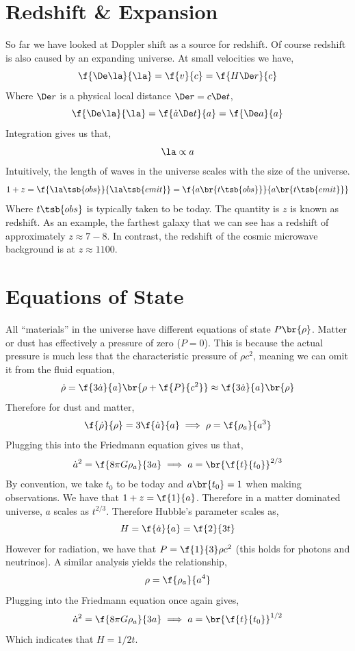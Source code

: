 \documentclass{article}
\begin{document}
\section{Redshift \& Expansion}
So far we have looked at Doppler shift as a source for redshift. Of course redshift is also caused by an expanding universe. At small velocities we have,
\[ \f{\De \la}{\la} = \f{v}{c} = \f{H \De r}{c} \]
Where $\De r$ is a physical local distance $\De r = c \De t$,
\[ \f{\De \la}{\la} = \f{\dot a \De t}{a} = \f{\De a}{a} \]
Integration gives us that,
\[ \la \propto a \]
Intuitively, the length of waves in the universe scales with the size of the universe.
\[ 1 + z = \f{\la\tsb{obs}}{\la\tsb{emit}} = \f{a\br{t\tsb{obs}}}{a\br{t\tsb{emit}}}  \]
Where $t\tsb{obs}$ is typically taken to be today. The quantity is $z$ is known as redshift. As an example, the farthest galaxy that we can see has a redshift of approximately $z \approx 7-8$. In contrast, the redshift of the cosmic microwave background is at $z \approx 1100$.

\section{Equations of State}
All ``materials'' in the universe have different equations of state $P\br{\rho}$. Matter or dust has effectively a pressure of zero ($P = 0$). This is because the actual pressure is much less that the characteristic pressure of $\rho c^2$, meaning we can omit it from the fluid equation,
\[ \dot\rho = \f{3 \dot a}{a} \br{\rho + \f{P}{c^2}} \approx \f{3 \dot a}{a} \br{\rho} \]
Therefore for dust and matter,
\[ \f{\dot \rho}{\rho} = 3\f{\dot a}{a} \implies \rho = \f{\rho_a}{a^3} \]
Plugging this into the Friedmann equation gives us that,
\[ \dot a^2 = \f{8\pi G \rho_a}{3a} \implies a = \br{\f{t}{t_0}}^{2/3} \]
By convention, we take $t_0$ to be today and $a\br{t_0} = 1$ when making observations. We have that $1 + z = \f{1}{a}$. Therefore in a matter dominated universe, $a$ scales as $t^{2/3}$. Therefore Hubble's parameter scales as,
\[ H = \f{\dot a}{a} = \f{2}{3t} \]
However for radiation, we have that $P = \f{1}{3} \rho c^2$ (this holds for photons and neutrinos). A similar analysis yields the relationship,
\[ \rho = \f{\rho_a}{a^4} \]
Plugging into the Friedmann equation once again gives,
\[ \dot a^2 = \f{8\pi G \rho_a}{3a} \implies a = \br{\f{t}{t_0}}^{1/2} \]
Which indicates that $H = 1/2t$. \\
\end{document}
